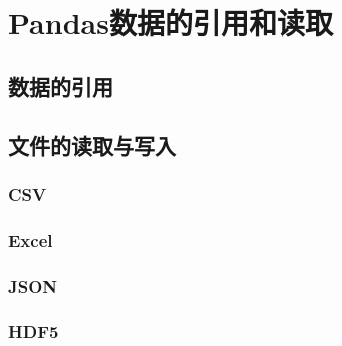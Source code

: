 \chapter{Pandas数据的引用和读取}
\label{cha:pandas_reference_read}

\section{数据的引用}
\label{sec:pandas_reference}


\section{文件的读取与写入}
\label{sec:pandas_read_write}

\subsection{CSV}
\label{subsec:pandas_read_csv}

\subsection{Excel}
\label{subsec:pandas_read_excel}


\subsection{JSON}
\label{subsec:pandas_read_json}

\subsection{HDF5}
\label{subsec:pandas_read_hdf5}

